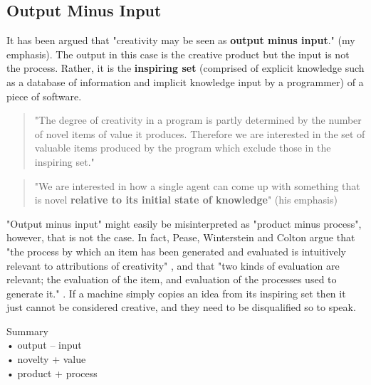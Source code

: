 \subsection{Output Minus Input}

It has been argued that "creativity may be seen as \textbf{output minus input}." \citep[p.2]{Pease2001}(my emphasis). The output in this case is the creative product but the input is not the process. Rather, it is the \textbf{inspiring set} (comprised of explicit knowledge such as a database of information and implicit knowledge input by a programmer) of a piece of software.

\begin{quote}
  "The degree of creativity in a program is partly determined by the number of novel items of value it produces. Therefore we are interested in the set of valuable items produced by the program which exclude those in the inspiring set." \citep[p.3]{Colton2001}
\end{quote}

\begin{quote}
  "We are interested in how a single agent can come up with something that is novel \textbf{relative to its initial state of knowledge}" \citep[p.72]{Ritchie2007}(his emphasis)
\end{quote}

"Output minus input" might easily be misinterpreted as "product minus process", however, that is not the case. In fact, Pease, Winterstein and Colton argue that "the process by which an item has been generated and evaluated is intuitively relevant to attributions of creativity" \citep[p.6]{Pease2001}, and that "two kinds of evaluation are relevant; the evaluation of the item, and evaluation of the processes used to generate it." \citep[p.7]{Pease2001}. If a machine simply copies an idea from its inspiring set then it just cannot be considered creative, and they need to be disqualified so to speak.

\begin{shaded}
  Summary\\
  •	output – input\\
  •	novelty + value\\
  •	product + process
\end{shaded}

